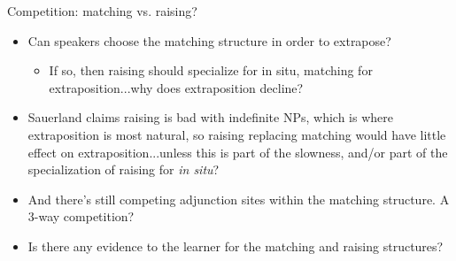 \documentclass[hyperref={pdfpagelabels=false}]{beamer}
\begin{document}
\begin{frame}{Competition: matching vs. raising? }

 \begin{itemize}
	\item Can speakers choose the matching structure in order to extrapose? 
		\begin{itemize}
			\item If so, then raising should specialize for in situ, matching for extraposition...why does extraposition decline?
		\end{itemize}
	\item Sauerland claims raising is bad with indefinite NPs, which is where extraposition is most natural, so raising replacing matching would have little effect on extraposition...unless this is part of the slowness, and/or part of the specialization of raising for \textsl{in situ}?
	\item And there's still competing adjunction sites within the matching structure. A 3-way competition?
	\item Is there any evidence to the learner for the matching and raising structures?
\end{itemize}


\end{frame}
\end{document}
